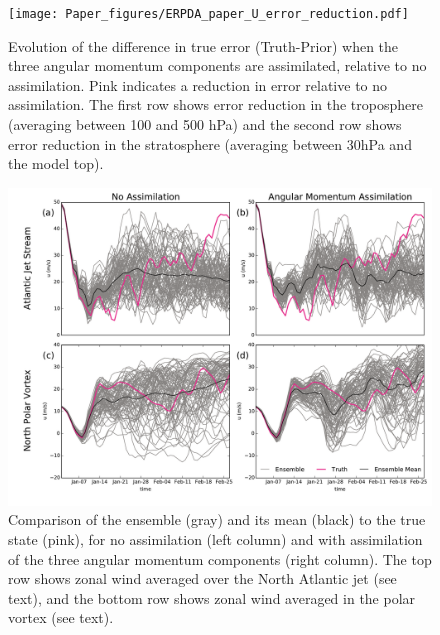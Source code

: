  \begin{figure}
	 \texttt{[image: Paper\_figures/ERPDA\_paper\_U\_error\_reduction.pdf]}
	 \caption{Evolution of the difference in true error (Truth-Prior) when the three angular momentum components are assimilated, relative to no assimilation. Pink indicates a reduction in error relative to no assimilation. The first row shows error reduction in the troposphere (averaging between 100 and 500 hPa) and the second row shows error reduction in the stratosphere (averaging between 30hPa and the model top).}
	 \label{fig:ER}
\end{figure}

 \begin{figure}
	 \includegraphics[width=\textwidth]{Paper_figures/ERPDA_paper_point_checks.pdf}
	 \caption{Comparison of the ensemble (gray) and its mean (black) to the true state (pink), for no assimilation (left column) and with assimilation of the three angular momentum components (right column). The top row shows zonal wind averaged over the North Atlantic jet (see text), and the bottom row shows zonal wind averaged in the polar vortex (see text).}
	 \label{fig:point_checks}
\end{figure}


